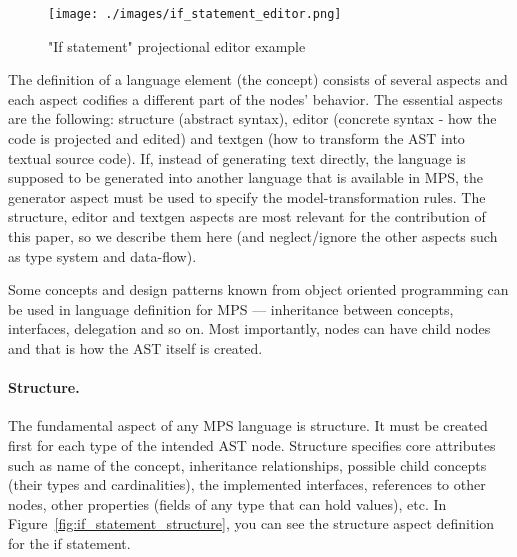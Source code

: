 \begin{figure}[ht]
	\centering
	\hspace{-4mm}
	\texttt{[image: ./images/if\_statement\_editor.png]}
	\caption{"If statement" projectional editor example}
	\label{fig:if_editor}
\end{figure}

The definition of a language element (the concept) consists of several aspects and each aspect codifies a different part of the nodes' behavior. The essential aspects are the following: structure (abstract syntax), editor (concrete syntax - how the code is projected and edited) and textgen (how to transform the AST into textual source code). If, instead of generating text directly, the language is supposed to be generated into another language that is available in MPS, the generator aspect must be used to specify the model-transformation rules. The structure, editor and textgen aspects are most relevant for the contribution of this paper, so we describe them here (and neglect/ignore the other aspects such as type system and data-flow).


Some concepts and design patterns known from object oriented programming can be used in language definition for MPS --- inheritance between concepts, interfaces, delegation and so on. Most importantly, nodes can have child nodes and that is how the AST itself is created.

 

\paragraph{Structure.}
 The fundamental aspect of any MPS language is structure. It must be created first for each type of the intended AST node. Structure specifies core attributes such as name of the concept, inheritance relationships, possible child concepts (their types and cardinalities), the implemented interfaces, references to other nodes, other properties (fields of any type that can hold values), etc.
In Figure~\ref{fig:if_statement_structure}, you can see the structure aspect definition for the if statement.

